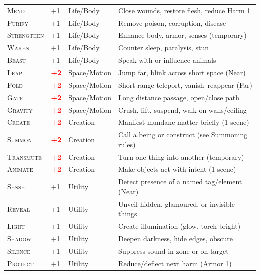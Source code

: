 \documentclass[10pt,a5paper]{book}
\newcommand{\dangerous}[1]{\textcolor{red}{\textbf{#1}}}
\newcommand{\tag}[1]{\textsc{#1}}
\begin{document}
\begin{longtable}{@{} p{2.5cm} p{1.2cm} p{2.5cm} p{6cm} @{}}
\tag{Mend} & +1 & Life/Body & Close wounds, restore flesh, reduce Harm 1 \\
\tag{Purify} & +1 & Life/Body & Remove poison, corruption, disease \\
\tag{Strengthen} & +1 & Life/Body & Enhance body, armor, senses (temporary) \\
\tag{Waken} & +1 & Life/Body & Counter sleep, paralysis, stun \\
\tag{Beast} & +1 & Life/Body & Speak with or influence animals \\
\midrule

\tag{Leap} & \dangerous{+2} & Space/Motion & Jump far, blink across short space (Near) \\
\tag{Fold} & \dangerous{+2} & Space/Motion & Short-range teleport, vanish–reappear (Far) \\
\tag{Gate} & \dangerous{+2} & Space/Motion & Long distance passage, open/close path \\
\tag{Gravity} & \dangerous{+2} & Space/Motion & Crush, lift, suspend, walk on walls/ceiling \\
\midrule

\tag{Create} & \dangerous{+2} & Creation & Manifest mundane matter briefly (1 scene) \\
\tag{Summon} & \dangerous{+2} & Creation & Call a being or construct (see Summoning rules) \\
\tag{Transmute} & \dangerous{+2} & Creation & Turn one thing into another (temporary) \\
\tag{Animate} & \dangerous{+2} & Creation & Make objects act with intent (1 scene) \\
\midrule

\tag{Sense} & +1 & Utility & Detect presence of a named tag/element (Near) \\
\tag{Reveal} & +1 & Utility & Unveil hidden, glamoured, or invisible things \\
\tag{Light} & +1 & Utility & Create illumination (glow, torch‐bright) \\
\tag{Shadow} & +1 & Utility & Deepen darkness, hide edges, obscure \\
\tag{Silence} & +1 & Utility & Suppress sound in zone or on target \\
\tag{Protect} & +1 & Utility & Reduce/deflect next harm (Armor 1) \\
\midrule


\end{longtable}
\end{document}
